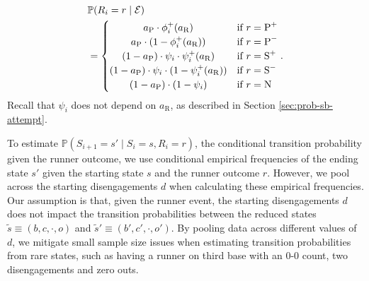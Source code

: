 \documentclass[opre,dblanonrev]{informs4}
\begin{document}
      \begin{align}
        \label{eqn:prob-runner-outcome-two-player}
        \begin{split}
          &\mathbb{P}(R_i = r \mid \mathcal{E})\\
          &= \begin{cases}
              \hfil a_\text{P} \cdot \phi_i^+(a_\text{R})                             & \mbox{if } r = \mbox{P}^+\\
              \hfil a_\text{P} \cdot (1 - \phi_i^+(a_\text{R}))                       & \mbox{if } r = \mbox{P}^-\\
              \hfil (1 - a_\text{P}) \cdot \psi_i \cdot \psi_i^+(a_\text{R})         & \mbox{if } r = \mbox{S}^+\\
              \hfil (1 - a_\text{P}) \cdot \psi_i \cdot (1 - \psi_i^+(a_\text{R}))   & \mbox{if } r = \mbox{S}^-\\
              \hfil (1 - a_\text{P}) \cdot (1 - \psi_i)                        & \mbox{if } r = \mbox{N}\\
          \end{cases}.
        \end{split}
      \end{align}
      Recall that $\psi_i$ does not depend on $a_\text{R}$, as described in Section \ref{sec:prob-sb-attempt}.

      To estimate $\mathbb{P}(S_{i+1} = s' \mid S_i   = s, R_i = r)$, the conditional transition probability given the runner outcome, we use conditional empirical frequencies of the ending state $s'$ given the starting state $s$ and the runner outcome $r$. However, we pool across the starting disengagements $d$ when calculating these empirical frequencies. Our assumption is that, given the runner event, the starting disengagements $d$ does not impact the transition probabilities between the reduced states $\tilde s \equiv (b, c, \cdot, o)$ and $\tilde s' \equiv (b', c', \cdot, o')$. By pooling data across different values of $d$, we mitigate small sample size issues when estimating transition probabilities from rare states, such as having a runner on third base with an 0-0 count, two disengagements and zero outs.
\end{document}
